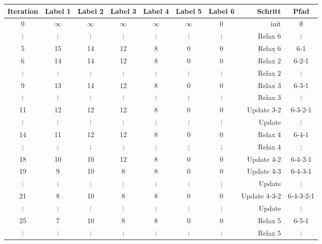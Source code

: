 \documentclass{scrartcl}
\begin{document}
\begin{table}[h]
       \begin{tabular}{c|cccccc|rc}
          Iteration & Label 1 & Label 2 & Label 3 & Label 4 & Label 5 & Label 6 & Schritt & Pfad\\
          \hline\hline
          0       & $\infty$ & $\infty$ & $\infty$ & $\infty$ & $\infty$ & 0 & init & $\emptyset$\\
          $\vdots$       & $\vdots$ & $\vdots$ & $\vdots$ & $\vdots$ & $\vdots$ & $\vdots$ & Relax 6 & $\vdots$\\
          5       & 15 & 14 & 12 & 8 & 0 & 0 & Relax 6 & 6-1\\
          6       & 14 & 14 & 12 & 8 & 0 & 0 & Relax 2 & 6-2-1\\
          $\vdots$       & $\vdots$ & $\vdots$ & $\vdots$ & $\vdots$ & $\vdots$ & $\vdots$ & Relax 2 & $\vdots$\\
          9       & 13 & 14 & 12 & 8 & 0 & 0 & Relax 3 & 6-3-1\\
          $\vdots$       & $\vdots$ & $\vdots$ & $\vdots$ & $\vdots$ & $\vdots$ & $\vdots$ & Relax 3 & $\vdots$\\
          11       & 12 & 12 & 12 & 8 & 0 & 0 & Update 3-2 & 6-3-2-1\\
          $\vdots$       & $\vdots$ & $\vdots$ & $\vdots$ & $\vdots$ & $\vdots$ & $\vdots$ & Update & $\vdots$\\
          14       & 11 & 12 & 12 & 8 & 0 & 0 & Relax 4 & 6-4-1\\
          $\vdots$       & $\vdots$ & $\vdots$ & $\vdots$ & $\vdots$ & $\vdots$ & $\vdots$ & Relax 4 & $\vdots$\\
          18       & 10 & 10 & 12 & 8 & 0 & 0 & Update 4-2 & 6-4-2-1\\
          19       & 9 & 10 & 8 & 8 & 0 & 0 & Update 4-3 & 6-4-3-1\\
          $\vdots$       & $\vdots$ & $\vdots$ & $\vdots$ & $\vdots$ & $\vdots$ & $\vdots$ & Update & $\vdots$\\
          21       & 8 & 10 & 8 & 8 & 0 & 0 & Update 4-3-2 & 6-4-3-2-1\\
          $\vdots$       & $\vdots$ & $\vdots$ & $\vdots$ & $\vdots$ & $\vdots$ & $\vdots$ & Update & $\vdots$\\
          25       & 7 & 10 & 8 & 8 & 0 & 0 & Relax 5 & 6-5-1\\
          $\vdots$       & $\vdots$ & $\vdots$ & $\vdots$ & $\vdots$ & $\vdots$ & $\vdots$ & Relax 5 & $\vdots$\\

\end{tabular}
\end{table}
\end{document}
